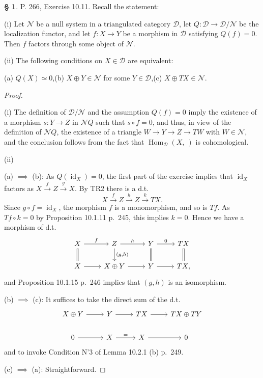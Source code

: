 \documentclass[12pt]{article}
\theoremstyle{remark}
\theoremstyle{definition}
\newtheorem{s}[thm]{\S}
\newcommand{\cc}{\mathcal}
\newcommand{\xr}{\xrightarrow}
\DeclareMathOperator{\id}{id}
\DeclareMathOperator{\Hom}{Hom}%
\begin{document}
\begin{s} P. 266, Exercise 10.11. Recall the statement: 

\noindent(i) Let $\cc N$ be a null system in a triangulated category $\cc D$, let $Q:\cc D\to\cc D/\cc N$ be the localization functor, and let $f:X\to Y$ be a morphism in $\cc D$ satisfying $Q(f)=0$. Then $f$ factors through some object of $\cc N$. 

\noindent(ii) The following conditions on $X\in\cc D$ are equivalent: 

\noindent(a) $Q(X)\simeq0$,\quad(b) $X\oplus Y\in\cc N$ for some $Y\in\cc D$,\quad(c) $X\oplus TX\in\cc N$.

\begin{proof}\ 

\noindent(i) The definition of $\cc D/\cc N$ and the assumption $Q(f)=0$ imply the existence of a morphism $s:Y\to Z$ in $\cc NQ$ such that $s\circ f=0$, and thus, in view of the definition of $\cc NQ$, the existence of a triangle $W\to Y\to Z\to TW$ with $W\in\cc N$, and the conclusion follows from the fact that $\Hom_{\cc D}(X,\ )$ is cohomological. 

\noindent(ii)

\noindent(a) $\implies$ (b): As $Q(\id_X)=0$, the first part of the exercise implies that $\id_X$ factors as $X\xr fZ\xr g X$. By TR2 there is a d.t. 
$$
X\xr fZ\xr hZ\xr kTX.
$$ 
Since $g\circ f=\id_X$, the morphism $f$ is a monomorphism, and so is $Tf$. As $Tf\circ k=0$ by Proposition 10.1.11 p.~245, this implies $k=0$. Hence we have a morphism of d.t. 
$$
\begin{tikzcd}
X\ar[equal]{d}\ar{r}{f}&Z\ar{d}{(g,h)}\ar{r}{h}&Y\ar[equal]{d}\ar{r}{0}&TX\ar[equal]{d}\\ 
X\ar{r}&X\oplus Y\ar{r}&Y\ar{r}&TX,
\end{tikzcd}
$$
and Proposition 10.1.15 p.~246 implies that $(g,h)$ is an isomorphism.\bigskip 

\noindent(b) $\implies$ (c): It suffices to take the direct sum of the d.t. 
$$
\begin{tikzcd} 
X\oplus Y\ar{r}&Y\ar{r}&TX\ar{r}&TX\oplus TY\\ 
0\ar{r}&X\ar{r}{=}&X\ar{r}&0
\end{tikzcd}
$$
and to invoke Condition N'3 of Lemma 10.2.1 (b) p.~249. 

\noindent(c) $\implies$ (a): Straightforward.
\end{proof}
\end{s}
%
%
\end{document}
